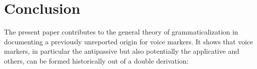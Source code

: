 \documentclass[oldfontcommands,oneside,a4paper,11pt]{article}
\newcommand{\ipa}[1]{{\phon \mbox{#1}}} %
\begin{document}
%
%
%
%
%
%
%


\section{Conclusion}
The present paper contributes to the general theory of grammaticalization in documenting a previously unreported origin for voice markers. It shows that voice markers, in particular the antipassive but also potentially the applicative and others, can be formed historically out of a double derivation:
\end{document}
